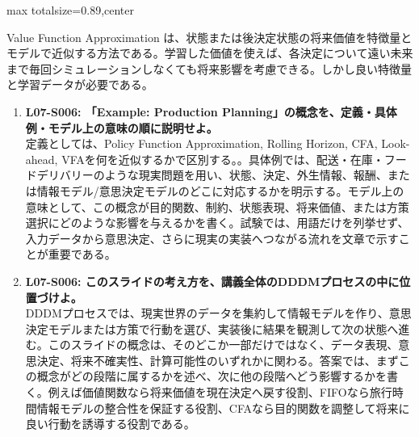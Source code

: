 \begin{minipage}[t]{0.58\textwidth}
\begin{adjustbox}{max totalsize={\textwidth}{0.89\textheight},center}
\begin{minipage}{\textwidth}
Value Function Approximation は、状態または後決定状態の将来価値を特徴量とモデルで近似する方法である。学習した価値を使えば、各決定について遠い未来まで毎回シミュレーションしなくても将来影響を考慮できる。しかし良い特徴量と学習データが必要である。\par{}\begin{enumerate}\item \textbf{L07-S006: 「Example: Production Planning」の概念を、定義・具体例・モデル上の意味の順に説明せよ。}\\定義としては、Policy Function Approximation, Rolling Horizon, CFA, Look-ahead, VFAを何を近似するかで区別する。。具体例では、配送・在庫・フードデリバリーのような現実問題を用い、状態、決定、外生情報、報酬、または情報モデル/意思決定モデルのどこに対応するかを明示する。モデル上の意味として、この概念が目的関数、制約、状態表現、将来価値、または方策選択にどのような影響を与えるかを書く。試験では、用語だけを列挙せず、入力データから意思決定、さらに現実の実装へつながる流れを文章で示すことが重要である。\item \textbf{L07-S006: このスライドの考え方を、講義全体のDDDMプロセスの中に位置づけよ。}\\DDDMプロセスでは、現実世界のデータを集約して情報モデルを作り、意思決定モデルまたは方策で行動を選び、実装後に結果を観測して次の状態へ進む。このスライドの概念は、そのどこか一部だけではなく、データ表現、意思決定、将来不確実性、計算可能性のいずれかに関わる。答案では、まずこの概念がどの段階に属するかを述べ、次に他の段階へどう影響するかを書く。例えば価値関数なら将来価値を現在決定へ戻す役割、FIFOなら旅行時間情報モデルの整合性を保証する役割、CFAなら目的関数を調整して将来に良い行動を誘導する役割である。\end{enumerate}
\end{minipage}
\end{adjustbox}
\end{minipage}


